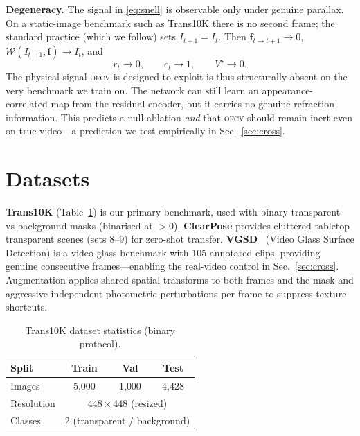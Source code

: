 \documentclass[conference]{IEEEtran}
\newcommand{\ofcv}{\textsc{ofcv}}
\begin{document}
\textbf{Degeneracy.} The signal in \eqref{eq:snell} is observable only under
genuine parallax. On a static-image benchmark such as Trans10K there is no
second frame; the standard practice (which we follow) sets $I_{t+1}=I_t$. Then
$\mathbf{f}_{t\to t+1}\!\to\!0$, $\mathcal{W}(I_{t+1},\mathbf{f})\!\to\!I_t$, and
\begin{equation}
r_t\to 0,\qquad c_t\to 1,\qquad V^\star\to 0 .
\end{equation}
The physical signal \ofcv{} is designed to exploit is thus structurally absent
on the very benchmark we train on. The network can still learn an
appearance-correlated map from the residual encoder, but it carries no genuine
refraction information. This predicts a null ablation \emph{and} that \ofcv{}
should remain inert even on true video---a prediction we test empirically in
Sec.~\ref{sec:cross}.

\section{Datasets}
\textbf{Trans10K} \cite{xie2020translab} (Table~\ref{tab:data}) is our primary
benchmark, used with binary transparent-vs-background masks (binarised at $>0$).
\textbf{ClearPose} \cite{chen2022clearpose} provides cluttered tabletop
transparent scenes (sets 8--9) for zero-shot transfer. \textbf{VGSD}~\cite{liu2024vgsd}
(Video Glass Surface Detection) is a video glass benchmark with $105$ annotated
clips, providing genuine consecutive frames---enabling the real-video control in
Sec.~\ref{sec:cross}. Augmentation
applies shared spatial transforms to both frames and the mask and aggressive
independent photometric perturbations per frame to suppress texture shortcuts.

\begin{table}[t]
\centering
\caption{Trans10K dataset statistics (binary protocol).}
\label{tab:data}
\begin{tabular}{lccc}
\toprule
Split & Train & Val & Test \\
\midrule
Images & 5{,}000 & 1{,}000 & 4{,}428 \\
Resolution & \multicolumn{3}{c}{$448\times448$ (resized)} \\
Classes & \multicolumn{3}{c}{2 (transparent / background)} \\
\bottomrule
\end{tabular}
\end{table}
\end{document}
